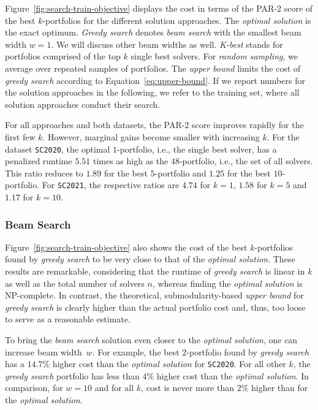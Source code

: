 \documentclass[a4paper,USenglish,pdfa]{lipics-v2021} %
\begin{document}
Figure~\ref{fig:search-train-objective} displays the cost in terms of the PAR-2 score of the best $k$-portfolios for the different solution approaches. 
The \emph{optimal solution} is the exact optimum.
\emph{Greedy search} denotes \emph{beam search} with the smallest beam width $w=1$. 
We will discuss other beam widths as well.
\emph{K-best} stands for portfolios comprised of the top $k$ single best solvers. 
For \emph{random sampling}, we average over repeated samples of portfolios.
The \emph{upper bound} limits the cost of \emph{greedy search} according to Equation~\ref{eq:upper-bound}.
If we report numbers for the solution approaches in the following, we refer to the training set, where all solution approaches conduct their search.

For all approaches and both datasets, the PAR-2 score improves rapidly for the first few $k$.
However, marginal gains become smaller with increasing $k$.
For the dataset \texttt{SC2020}, the optimal $1$-portfolio, i.e., the single best solver, has a penalized runtime $5.51$ times as high as the $48$-portfolio, i.e., the set of all solvers.
This ratio reduces to $1.89$ for the best $5$-portfolio and $1.25$ for the best $10$-portfolio.
For \texttt{SC2021}, the respective ratios are $4.74$ for $k=1$, $1.58$ for $k=5$ and $1.17$ for $k=10$.

\subsubsection{Beam Search}

Figure~\ref{fig:search-train-objective} also shows the cost of the best $k$-portfolios found by \emph{greedy search} to be very close to that of the \emph{optimal solution}.
These results are remarkable, considering that the runtime of \emph{greedy search} is linear in $k$ as well as the total number of solvers $n$, whereas finding the \emph{optimal solution} is NP-complete.
In contrast, the theoretical, submodularity-based \emph{upper bound} for \emph{greedy search} is clearly higher than the actual portfolio cost and, thus, too loose to serve as a reasonable estimate.

To bring the \emph{beam search} solution even closer to the \emph{optimal solution}, one can increase beam width~$w$.
For example, the best $2$-portfolio found by \emph{greedy search} has a $14.7\%$ higher cost than the \emph{optimal solution} for \texttt{SC2020}.
For all other $k$, the \emph{greedy search} portfolio has less than $4\%$ higher cost than the \emph{optimal solution}.
In comparison, for $w=10$ and for all $k$, cost is never more than $2\%$ higher than for the \emph{optimal solution}.
\end{document}
